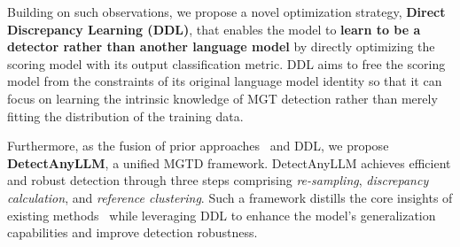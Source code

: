 Building on such observations, we propose a novel optimization strategy, \textbf{Direct Discrepancy Learning (DDL)}, that enables the model to \textbf{learn to be a detector rather than another language model} by directly optimizing the scoring model with its output classification metric.
%
DDL aims to free the scoring model from the constraints of its original language model identity so that it can focus on learning the intrinsic knowledge of MGT detection rather than merely fitting the distribution of the training data. 

Furthermore, as the fusion of prior approaches~\cite{fastdetectgpt, imbd} and DDL, we propose \textbf{DetectAnyLLM}, a unified MGTD framework.
%
DetectAnyLLM achieves efficient and robust detection through three steps comprising \textit{re-sampling}, \textit{discrepancy calculation}, and \textit{reference clustering}.
%
Such a framework distills the core insights of existing methods~\cite{detectgpt, fastdetectgpt} while leveraging DDL to enhance the model’s generalization capabilities and improve detection robustness.
